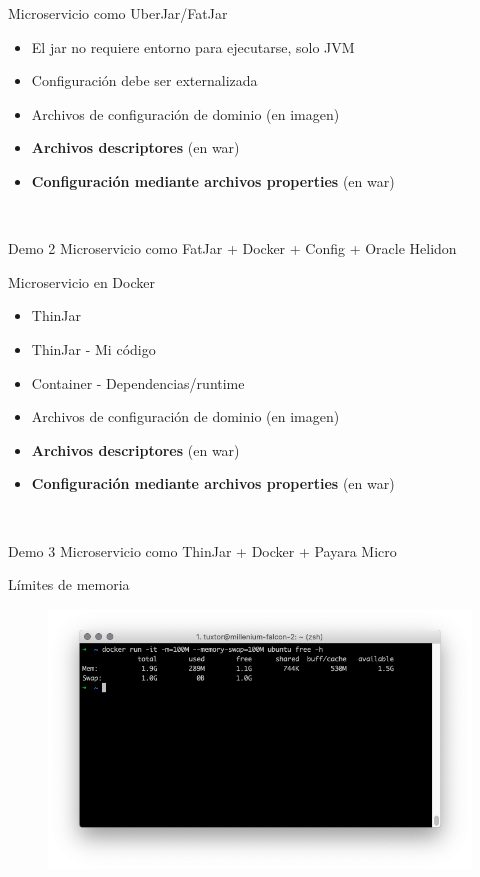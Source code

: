 \documentclass[aspectratio=169]{beamer}
\begin{document}
\begin{frame}{Microservicio como UberJar/FatJar}
    \begin{itemize}
        \item El jar no requiere entorno para ejecutarse, solo JVM
        \item Configuración debe ser externalizada
        \item Archivos de configuración de dominio (en imagen)
        \item \textbf{Archivos descriptores} (en war)
        \item \textbf{Configuración mediante archivos properties} (en war)
    \end{itemize}
\end{frame} 


\begin{frame}{Demo 2}
Microservicio como FatJar + Docker + Config + Oracle Helidon
\end{frame}

\begin{frame}{Microservicio en Docker}
    \begin{itemize}
        \item ThinJar
        \item ThinJar - Mi código
        \item Container - Dependencias/runtime
        \item Archivos de configuración de dominio (en imagen)
        \item \textbf{Archivos descriptores} (en war)
        \item \textbf{Configuración mediante archivos properties} (en war)
    \end{itemize}
\end{frame} 

\begin{frame}{Demo 3}
    Microservicio como ThinJar + Docker + Payara Micro
\end{frame}


\begin{frame}{Límites de memoria}
    \begin{figure}
        \centering
        \includegraphics[width=0.9\linewidth]{Images/dockermem.png}
        \label{fig:container}
    \end{figure}
\end{frame}
\end{document}
